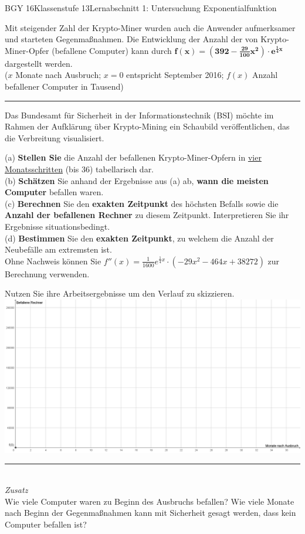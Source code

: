 \documentclass[oneside,openany,headings=optiontotoc,11pt,numbers=noenddot]{scrreprt}
\begin{document}
\begin{worksheet}{BGY 16}{Klassenstufe 13}{Lernabschnitt 1: Untersuchung Exponentialfunktion}
		\newpage
		\begin{framed}
			\noindent
			Mit steigender Zahl der Krypto-Miner wurden auch die Anwender aufmerksamer und starteten Gegenmaßnahmen. Die Entwicklung der Anzahl der von Krypto-Miner-Opfer (befallene Computer) kann durch \(\mathbf{f(x) = (392-\frac{29}{100}x^2)\cdot{}e^{\frac{1}{4}x}}\) dargestellt werden.\\
			\tiny{(\(x\) Monate nach Ausbruch; \(x = 0\) entspricht September 2016; \(f(x)\) Anzahl befallener Computer in Tausend)}\normalsize\\
			\rule{\textwidth}{0.1pt}
			\noindent
			Das Bundesamt für Sicherheit in der Informationstechnik (BSI) möchte im Rahmen der Aufklärung über Krypto-Mining ein Schaubild veröffentlichen, das die Verbreitung visualisiert.\\
			\par\noindent
			(a) \textbf{Stellen Sie} die Anzahl der befallenen Krypto-Miner-Opfern in \underline{vier Monatsschritten} (bis 36) tabellarisch dar.\\
			(b) \textbf{Schätzen} Sie anhand der Ergebnisse aus (a) ab, \textbf{wann die meisten Computer} befallen waren.\\
			(c) \textbf{Berechnen} Sie den \textbf{exakten Zeitpunkt} des höchsten Befalls sowie die \textbf{Anzahl der befallenen Rechner} zu diesem Zeitpunkt. Interpretieren Sie ihr Ergebnisse situationsbedingt.\\
			(d) \textbf{Bestimmen} Sie den \textbf{exakten Zeitpunkt}, zu welchem die Anzahl der Neubefälle am extremsten ist.\\
			Ohne Nachweis können Sie \(f''(x) = \frac{1}{1600}e^{\frac{1}{4}x}\cdot(-29x^2-464x+38272)\) zur Berechnung verwenden.
		\end{framed}
		Nutzen Sie ihre Arbeitsergebnisse um den Verlauf zu skizzieren.\\
		\hspace*{-1cm}\includegraphics[height=0.43\textheight]{../99_Bilder/KoordLeer_2.png}\\
		\rule{\textwidth}{0.1pt}\\
		\small{\textit{Zusatz}}\normalsize\\
		Wie viele Computer waren zu Beginn des Ausbruchs befallen? Wie viele Monate nach Beginn der Gegenmaßnahmen kann mit Sicherheit gesagt werden, dass kein Computer befallen ist?
	\end{worksheet}
\end{document}
